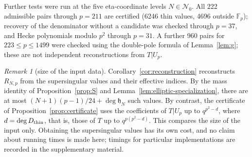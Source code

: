 \documentclass[11pt,a4paper]{article}
\numberwithin{equation}{section}
\theoremstyle{definition}
\theoremstyle{remark}
\newtheorem{remark}[theorem]{Remark}
\newcommand{\Fp}{\mathbb F_p}
\begin{document}
Further tests were run at the five eta-coordinate levels $N\in\mathcal N_0$.
All 222 admissible pairs through $p=211$ are certified
(6246 thin values, 4696 outside $\Fp$); recovery of the denominator without
a candidate was checked through $p=37$, and Hecke polynomials modulo $p^2$
through $p=31$. A further 960 pairs for $223\le p\le1499$ were checked using the
double-pole formula of Lemma~\ref{lem:g}; these are not independent
reconstructions from $T|U_p$.

\begin{remark}[size of the input data]\label{rem:datasize}
Corollary~\ref{cor:reconstruction} reconstructs $R_{N,p}$ from the
supersingular values and their effective indices. By the mass identity of
Proposition~\ref{prop:S} and Lemma~\ref{lem:elliptic-specialization}, there
are at most $(N+1)(p-1)/24+\deg\mathfrak h_N$ such values. By contrast, the
certificate of Proposition~\ref{prop:certificate} uses the coefficients of
$T|U_p$ up to $q^{p^2-d}$, where $d=\deg D_{\rm thin}$, that is, those of $T$ up to $q^{p(p^2-d)}$.
This compares the size of the input only. Obtaining the supersingular
values has its own cost, and no claim about running times is made here;
timings for particular implementations are recorded in the supplementary
material.
\end{remark}
\end{document}

